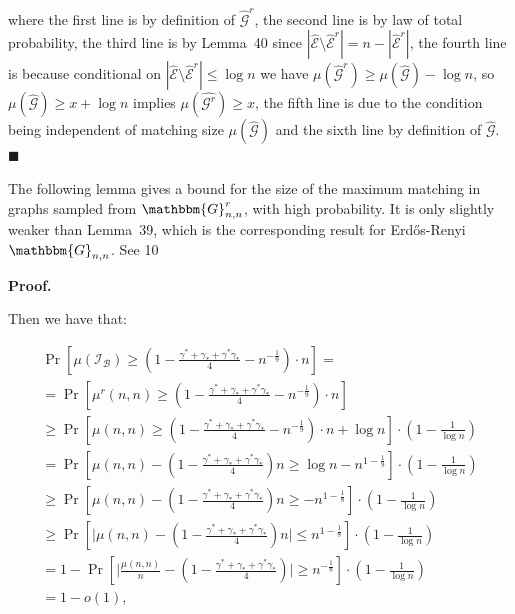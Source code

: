 \documentclass[10pt,a4paper]{article}
\begin{document}
where the first line is by definition of $\hat{\mathcal{G}}^{r}$, the second line is by law of total probability, the third line is by Lemma 40 since $|\hat{\mathcal{E}}\setminus\hat{\mathcal{E}}^{r}|=n-|\hat{\mathcal{E}}^{r}|$, the fourth line is because conditional on $|\hat{\mathcal{E}}\setminus\hat{\mathcal{E}}^{r}|\leq\log{n}$ we have $\mu(\hat{\mathcal{G}}^{r})\geq\mu(\hat{\mathcal{G}})-\log{n}$, so $\mu(\hat{\mathcal{G}})\geq x+\log{n}$ implies $\mu(\hat{\mathcal{G}^{r}})\geq x$, the fifth line is due to the condition being independent of matching size $\mu(\hat{\mathcal{G}})$ and the sixth line by definition of $\hat{\mathcal{G}}$.
\ensuremath{\blacksquare}\par





The following lemma gives a bound for the size of the maximum matching in graphs sampled from $\mathbbm{G}^{r}_{n,n}$, with high probability. It is only slightly weaker than Lemma 39, which is the corresponding result for Erdős-Renyi $\mathbbm{G}_{n,n}$.
See 10\par




\par\medskip\noindent\textbf{Proof.}\par



Then we have that:\par


\[\begin{gathered}
\displaystyle\Pr \displaystyle\left[\mu(\mathcal{I}_{\mathcal{B}})\geq\left(1-\frac{\gamma^{*}+\gamma_{*}+\gamma^{*}\gamma_{*}}{4}-n^{-\frac{1}{9}}\right)\cdot n\right]= \\
\displaystyle=\Pr\left[\mu^{r}(n,n)\geq\left(1-\frac{\gamma^{*}+\gamma_{*}+\gamma^{*}\gamma_{*}}{4}-n^{-\frac{1}{9}}\right)\cdot n\right] \\
\displaystyle\geq\Pr\left[\mu(n,n)\geq\left(1-\frac{\gamma^{*}+\gamma_{*}+\gamma^{*}\gamma_{*}}{4}-n^{-\frac{1}{9}}\right)\cdot n+\log{n}\right]\cdot\left(1-\frac{1}{\log{n}}\right) \\
\displaystyle=\Pr\left[\mu(n,n)-\left(1-\frac{\gamma^{*}+\gamma_{*}+\gamma^{*}\gamma_{*}}{4}\right)n\geq\log{n}-n^{1-\frac{1}{9}}\right]\cdot\left(1-\frac{1}{\log{n}}\right) \\
\displaystyle\geq\Pr\left[\mu(n,n)-\left(1-\frac{\gamma^{*}+\gamma_{*}+\gamma^{*}\gamma_{*}}{4}\right)n\geq-n^{1-\frac{1}{8}}\right]\cdot\left(1-\frac{1}{\log{n}}\right) \\
\displaystyle\geq\Pr\left[\big|\mu(n,n)-\left(1-\frac{\gamma^{*}+\gamma_{*}+\gamma^{*}\gamma_{*}}{4}\right)n\big|\leq n^{1-\frac{1}{8}}\right]\cdot\left(1-\frac{1}{\log{n}}\right) \\
\displaystyle=1-\Pr\left[\big|\frac{\mu(n,n)}{n}-\left(1-\frac{\gamma^{*}+\gamma_{*}+\gamma^{*}\gamma_{*}}{4}\right)\big|\geq n^{-\frac{1}{8}}\right]\cdot\left(1-\frac{1}{\log{n}}\right) \\
\displaystyle=1-o(1),
\end{gathered}\]
\end{document}
